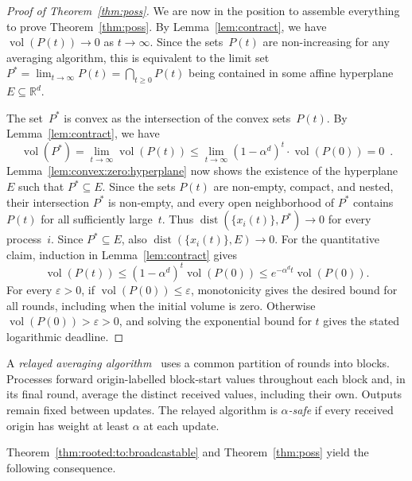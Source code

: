 \documentclass[preprint,12pt,a4paper]{elsarticle}
\theoremstyle{plain}
\theoremstyle{definition}
\DeclareMathOperator{\vol}{vol}
\DeclareMathOperator{\dist}{dist}
\newcommand{\IR}{\mathbb{R}}
\renewcommand{\leq}{\leqslant}
\renewcommand{\geq}{\geqslant}
\begin{document}
\begin{proof}[Proof of Theorem~\ref{thm:poss}]
	We are now in the position to assemble everything to prove Theorem~\ref{thm:poss}.
	By Lemma~\ref{lem:contract}, we have $\vol(P(t)) \to 0$ as $t\to\infty$.
	Since the sets~$P(t)$ are non-increasing for any averaging algorithm, this is equivalent to the limit set $P^* = \lim_{t\to\infty} P(t) = \bigcap_{t\geq 0} P(t)$ being contained in some affine hyperplane $E\subseteq \IR^d$.

	The set~$P^*$ is convex as the intersection of the convex sets~$P(t)$.
	By Lemma~\ref{lem:contract}, we have
	\begin{equation*}
		\vol(P^*) = \lim_{t\to\infty} \vol(P(t)) \leq \lim_{t\to\infty} \left(1 - \alpha^d \right)^t \cdot \vol(P(0)) = 0
		\enspace.
	\end{equation*}
	Lemma~\ref{lem:convex:zero:hyperplane} now shows the existence of the hyperplane~$E$ such that $P^*\subseteq E$.
	Since the sets $P(t)$ are non-empty, compact, and nested, their intersection $P^*$ is non-empty, and every open neighborhood of $P^*$ contains $P(t)$ for all sufficiently large~$t$.
	Thus $\dist(\{x_i(t)\},P^*)\to0$ for every process~$i$.
	Since $P^*\subseteq E$, also $\dist(\{x_i(t)\},E)\to0$.
	For the quantitative claim, induction in Lemma~\ref{lem:contract} gives
	\[
		\vol(P(t))\leq(1-\alpha^d)^t\vol(P(0))
		\leq e^{-\alpha^d t}\vol(P(0)).
	\]
	For every $\varepsilon>0$, if $\vol(P(0))\leq\varepsilon$, monotonicity gives the desired bound for all rounds, including when the initial volume is zero.
	Otherwise $\vol(P(0))>\varepsilon>0$, and solving the exponential bound for $t$ gives the stated logarithmic deadline.
\end{proof}


A \emph{relayed averaging algorithm}~\cite{CBFN16:icalp} uses a common partition of rounds into blocks.
Processes forward origin-labelled block-start values throughout each block and, in its final round, average the distinct received values, including their own.
Outputs remain fixed between updates.
The relayed algorithm is \emph{$\alpha$-safe} if every received origin has weight at least $\alpha$ at each update.

Theorem~\ref{thm:rooted:to:broadcastable} and Theorem~\ref{thm:poss} yield the following consequence.
\end{document}
